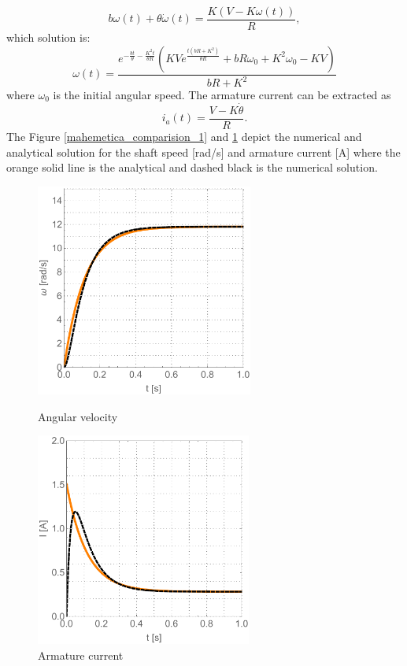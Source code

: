 \documentclass[12pt,english]{article}
\begin{document}
\begin{equation}
	b \omega(t)+\theta \dot \omega(t)=\frac{K (V-K \omega(t))}{R},
\end{equation} 
which solution is:
\begin{equation}
	\omega(t) = \frac{e^{-\frac{b t}{\theta }-\frac{K^2 t}{\theta  R}} \left(K V e^{\frac{t \left(b R+K^2\right)}{\theta  R}}+b R \text{$\omega_0 $}+K^2 \text{$\omega_0 $}-K V\right)}{b R+K^2}
\end{equation}
where $\omega_0$ is the initial angular speed.
The armature current can be extracted as
\begin{equation}
	i_a(t) =\frac{V-K\dot \theta}{R}.
\end{equation}
The Figure \ref{mahemetica_comparision_1} and \ref{mahemetica_comparision_2} depict the numerical and analytical solution for the shaft speed [rad/s] and armature current [A] where the orange solid line is the analytical and dashed black is the numerical solution.
 \begin{figure}[htb!]
	\centering
	\includegraphics[height=7cm]{figures/mahemetica_comparision_1}
	\caption{Angular velocity}
	\label{mahemetica_comparision_1}
	\endminipage\hfill
	\centering
	\includegraphics[height=7cm]{figures/mahemetica_comparision_2}
	\caption{Armature current}
	\label{mahemetica_comparision_2}
	\endminipage\hfill
\end{figure}
\end{document}
